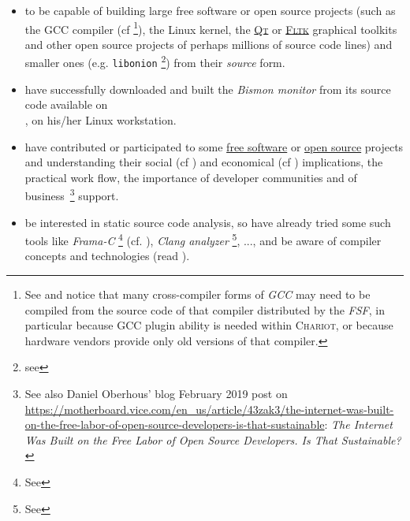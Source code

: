 \begin{itemize}
\item to be capable of building large free software or open source projects (such as
  the GCC compiler (cf \cite{gcc-internals} \footnote{See
   and notice that many cross-compiler forms
  of \emph{GCC} may need to be compiled from the source code of that
  compiler distributed by the \emph{FSF}, in particular because GCC
  plugin ability is needed within \textsc{Chariot}, or because
  hardware vendors provide only old versions of that compiler.}), the
  Linux kernel, the \href{https://qt.io/}{\textsc{Qt}} or
  \href{https://www.fltk.org/}{\textsc{Fltk}} graphical toolkits and
  other open source projects of perhaps millions of source code lines)
  and smaller ones (e.g. \texttt{libonion} \footnote{see
  }) from their \emph{source}
   
   form.

\item have successfully downloaded and built the \emph{Bismon monitor}
   from its source code  available on
  \\ , on his/her Linux
  workstation.
  
\item have contributed or participated to some
  \href{https://www.gnu.org/philosophy/free-sw.en.html}{free software}
  or \href{https://opensource.org/}{open source} projects and
  understanding their social (cf \cite{Raymond:2001:CathBaz}) and
  economical (cf \cite{Weber:2004:SuccessOpenSource,
    Tirole:2016:EcoBienCommun, Nagle:2018:Contributing,
    DiCosmo:1998:Holdup, Lerner-Tirole:2000:economics-open-source})
  implications, the practical work flow, the importance of developer
  communities and of business~\footnote{See also Daniel Oberhous' blog
  February 2019 post on
  \url{https://motherboard.vice.com/en_us/article/43zak3/the-internet-was-built-on-the-free-labor-of-open-source-developers-is-that-sustainable}:
  \emph{The Internet Was Built on the Free Labor of Open Source
  Developers. Is That Sustainable?}} support.
  
\item be interested in static source code analysis, so have already
  tried some such tools like \emph{Frama-C} \footnote{See
    } (cf. \cite{Cuoq:2012:Frama-C}),
  \emph{Clang analyzer} \footnote{See
    }, ..., and be aware of
   compiler concepts and technologies (read
  \cite{Aho:2006:DragonBook}).


\end{itemize}
